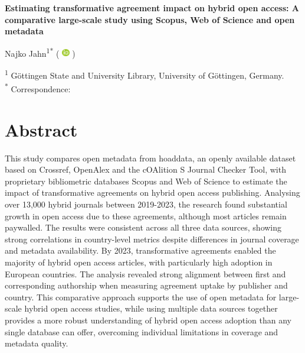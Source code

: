\documentclass[a4paper,man,floatsintext,longtable,noextraspace,10pt]{apa6}
\begin{document}
\thispagestyle{otherpage}


\begin{large}
\textbf{Estimating transformative agreement impact on hybrid open access: A comparative large-scale study using Scopus, Web of Science and open metadata}
\end{large}

\newcommand{\orcid}{%
  \begingroup\normalfont
  \includegraphics[height=0.9em]{orcid_logo}%
  \endgroup
}

Najko Jahn\textsuperscript{1}\textsuperscript{*} 
(\orcid{} \href{https://orcid.org/0000-0001-5105-1463}{\color{black}{0000-0001-5105-1463}})

\textsuperscript{1} Göttingen State and University Library, University of Göttingen, Germany. \\

\textsuperscript{*} Correspondence: \href{mailto:najko.jahn@sub.uni-goettingen.de}{\color{black}{najko.jahn@sub.uni-goettingen.de}} 

\section*{Abstract}
{This study compares open metadata from hoaddata, an openly available dataset based on Crossref, OpenAlex and the cOAlition S Journal Checker Tool, with proprietary bibliometric databases Scopus and Web of Science to estimate the impact of transformative agreements on hybrid open access publishing. Analysing over 13,000 hybrid journals between 2019-2023, the research found substantial growth in open access due to these agreements, although most articles remain paywalled. The results were consistent across all three data sources, showing strong correlations in country-level metrics despite differences in journal coverage and metadata availability. By 2023, transformative agreements enabled the majority of hybrid open access articles, with particularly high adoption in European countries. The analysis revealed strong alignment between first and corresponding authorship when measuring agreement uptake by publisher and country. This comparative approach supports the use of open metadata for large-scale hybrid open access studies, while using multiple data sources together provides a more robust understanding of hybrid open access adoption than any single database can offer, overcoming individual limitations in coverage and metadata quality.}
\end{document}
